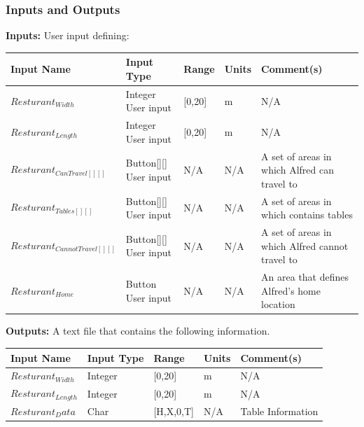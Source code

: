 \documentclass [10pt]{article}
\begin{document}

\subsubsection{Inputs and Outputs}

\textbf{Inputs:} User input defining:\\

\begin{longtable}{|l|l|l|l|l|}\hline 
	\rowcolor{tableCell}\textbf{Input Name} & \textbf{Input Type} & \textbf{Range} & \textbf{Units} & \textbf{Comment(s)} \\ \hline
	$ Resturant_{Width} $ & Integer User input &  [0,20] & m &  N/A\\ \hline
	\rowcolor{tableCell}$ Resturant_{Length} $ & Integer User input &  [0,20] & m &  N/A\\ \hline
	$ Resturant_{CanTravel[][]} $ & Button[][] User input &  N/A & N/A & A set of areas in which Alfred can travel to \\ \hline
	\rowcolor{tableCell}$ Resturant_{Tables[][]} $ & Button[][] User input &  N/A & N/A & A set of areas in which contains tables \\ \hline
	$ Resturant_{CannotTravel[][]} $ & Button[][] User input &  N/A & N/A & A set of areas in which Alfred cannot travel to \\ \hline
	\rowcolor{tableCell}$ Resturant_{Home} $ & Button User input &  N/A & N/A & An area that defines Alfred's home location \\ \hline
\end{longtable}


\textbf{Outputs: }A text file that contains the following information. \\
\begin{longtable}{|l|l|l|l|l|}\hline 
	\rowcolor{tableCell}\textbf{Input Name} & \textbf{Input Type} & \textbf{Range} & \textbf{Units} & \textbf{Comment(s)} \\ \hline
	$ Resturant_{Width} $ & Integer &  [0,20] & m &  N/A\\ \hline
	\rowcolor{tableCell}$ Resturant_{Length} $ & Integer  &  [0,20] & m &  N/A\\ \hline
	$ Resturant_Data $& Char  &  [H,X,0,T] & N/A & Table Information \\ \hline
\end{longtable}
\end{document}
